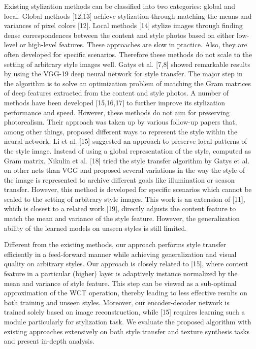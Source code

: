 Existing stylization methods can be classified into two categories: global and local. Global methods [12,13] achieve stylization through matching the means and variances of pixel colors [12]. Local methods [14] stylize images through finding dense correspondences between the content and style photos based on either low-level or high-level features. These approaches are slow in practice. Also, they are often developed for specific scenarios. Therefore these methods do not scale to the setting of arbitrary style images well.\newline
Gatys et al. [7,8] showed remarkable results by using the VGG-19 deep neural network for style transfer. The major step in the algorithm is to solve an optimization problem of matching the Gram matrices of deep features extracted from the content and style photos. A number of methods have been developed [15,16,17] to further improve its stylization performance and speed. However, these methods do not aim for preserving photorealism.\newline
Their approach was taken up by various follow-up papers that, among other things, proposed different  ways  to  represent  the  style  within  the  neural  network. Li et al. [15] suggested an approach to preserve local patterns of the style image. Instead of using a global representation of the style, computed as Gram matrix.\newline
Nikulin et al. [18] tried the style transfer algorithm by Gatys et al. on other nets than VGG and proposed several  variations  in  the  way  the  style  of  the  image  is  represented  to  archive different goals like illumination or season transfer. However, this method is developed for specific scenarios which cannot be scaled to the setting of arbitrary style images.\newline
This work is an extension of [11], which is closest to a related work [19], directly adjusts the content feature to match the mean and variance of the style feature. However, the generalization ability of the learned models on unseen styles is still limited.\newline

Different from the existing methods, our approach performs style transfer efficiently in a feed-forward
manner while achieving generalization and visual quality on arbitrary styles. Our approach is closely
related to [15], where content feature in a particular (higher) layer is adaptively instance normalized
by the mean and variance of style feature. This step can be viewed as a sub-optimal approximation
of the WCT operation, thereby leading to less effective results on both training and unseen styles.
Moreover, our encoder-decoder network is trained solely based on image reconstruction, while [15]
requires learning such a module particularly for stylization task. We evaluate the proposed algorithm
with existing approaches extensively on both style transfer and texture synthesis tasks and present
in-depth analysis.